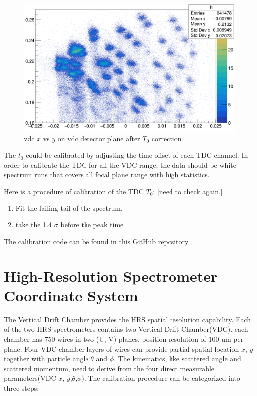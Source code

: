\begin{figure}
    \centering
    \includegraphics[width=\textwidth]{images/chap4/vdc_t0_after_correction.png}
    \caption{vdc $x$ vs $y$ on vdc detector plane after $T_0$ correction}
    \label{fig:vdc_t0_after_correction}
\end{figure}

The $t_0$ could be calibrated by adjusting the time offset of each TDC channel. In order to calibrate the TDC for all the VDC range, the data should be white spectrum runs that covers all focal plane range with high statistics. 

Here is a procedure of calibration of the TDC $T_0$: [need to check again.]
\begin{enumerate}
    \item Fit the failing tail of the spectrum. 
    \item take the 1.4 $\sigma$ before the peak time
\end{enumerate}

The calibration code can be found in this \hyperlink{https://github.com/Jiansiyu/GeneralScripts/tree/master/VDC_T0_Cali}{GitHub repository}  


\section{High-Resolution Spectrometer Coordinate System}


The Vertical Drift Chamber provides the HRS spatial resolution capability. Each of the two HRS spectrometers contains two Vertical Drift Chamber(VDC). each chamber has 750 wires in two (U, V) planes, position resolution of 100 um per plane. Four VDC chamber layers of wires can provide partial spatial location $x$, $y$ together with particle angle $\theta$ and $\phi$. The kinematics, like scattered angle and scattered momentum, need to derive from the four direct measurable parameters(VDC $x$, $y$,$\theta$,$\phi$). The calibration procedure can be categorized into three steps:

